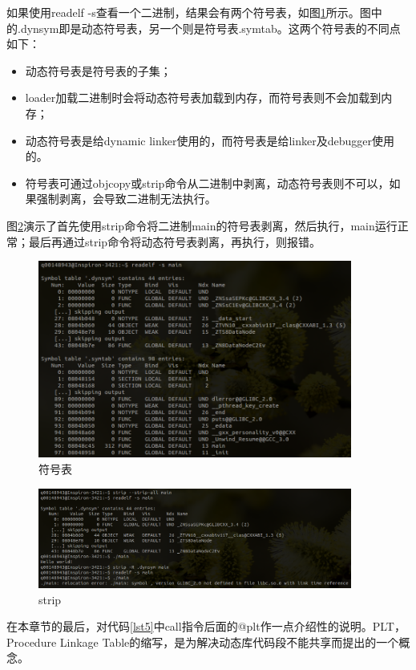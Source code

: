 \documentclass[a4paper, 12pt, titlepage]{article}
\newlength{\du}
\begin{document}
如果使用readelf -s查看一个二进制，结果会有两个符号表，如图\ref{fig33}所示。图中的.dynsym即是动态符号表，另一个则是符号表.symtab。这两个符号表的不同点如下：
\begin{itemize}
\item 动态符号表是符号表的子集；
\item loader加载二进制时会将动态符号表加载到内存，而符号表则不会加载到内存；
\item 动态符号表是给dynamic linker使用的，而符号表是给linker及debugger使用的。
\item 符号表可通过objcopy或strip命令从二进制中剥离，动态符号表则不可以，如果强制剥离，会导致二进制无法执行。
\end{itemize}
图\ref{fig34}演示了首先使用strip命令将二进制main的符号表剥离，然后执行，main运行正常；最后再通过strip命令将动态符号表剥离，再执行，则报错。
\begin{figure}[!htb]
  \setlength{\abovecaptionskip}{0pt}
  \centering
  \includegraphics[width=0.92\textwidth]{both.png}
  \caption{符号表}
  \label{fig33}
\end{figure}

\begin{figure}[!htb]
  \setlength{\abovecaptionskip}{0pt}
  \centering
  \includegraphics[width=0.92\textwidth]{strip.png}
  \caption{strip}
  \label{fig34}
\end{figure}

在本章节的最后，对代码\ref{lst5}中call指令后面的@plt作一点介绍性的说明。PLT，Procedure Linkage Table的缩写，是为解决动态库代码段不能共享而提出的一个概念。
\end{document}
